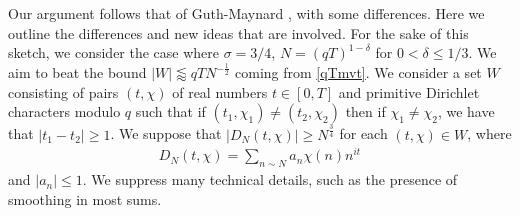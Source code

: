 \documentclass[12pt]{amsart}
\theoremstyle{definition}
\theoremstyle{plain}
\theoremstyle{remark}
\numberwithin{equation}{section}
\numberwithin{theorem}{section}
\numberwithin{equation}{section}
\begin{document}
	Our argument follows that of Guth-Maynard \cite{GM}, with some differences. Here we outline the differences and new ideas that are involved. For the sake of this sketch, we consider the case where $\sigma = 3/4$, $N=(qT)^{1-\delta}$ for $0< \delta \leq 1/3$. We aim to beat the bound $|W| \lessapprox  qTN^{-\frac{1}{2}}$ coming from \eqref{qTmvt}. We consider a set $W$ consisting of pairs $(t,\chi)$ of real numbers $t \in [0,T]$ and primitive Dirichlet characters modulo $q$ such that if $(t_1,\chi_1) \neq (t_2,\chi_2)$ then if $\chi_1 \neq \chi_2$, we have that $|t_1-t_2| \geq 1$. We suppose that $|D_N(t,\chi)| \geq N^{\frac{3}{4}}$ for each $(t,\chi) \in W$, where 
	\begin{align*}
		D_N(t,\chi) = \sum_{n \sim N} a_n \chi(n) n^{it}
	\end{align*}
	and $|a_n| \leq 1$. We suppress many technical details, such as the presence of smoothing in most sums.
	
\end{document}
